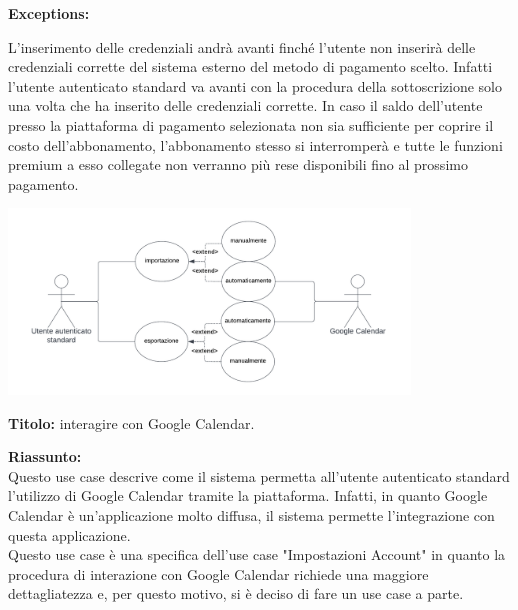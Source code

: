 \begin{listaPersonale}[UC]{}
\begin{listaPersonale2}[UC] {}
        \textbf{Exceptions:}
        \begin{enumerate}[label=\textbf{[exception \arabic{enumiii}]}, ref= \textbf{[exception \arabic{enumiii}]}]
             L'inserimento delle credenziali andrà avanti finché l'utente non inserirà delle credenziali corrette del sistema esterno del metodo di pagamento scelto. Infatti l'utente autenticato standard va avanti con la procedura della sottoscrizione solo una volta che ha inserito delle credenziali corrette.
             In caso il saldo dell'utente presso la piattaforma di pagamento selezionata non sia sufficiente per coprire il costo dell'abbonamento, l'abbonamento stesso si interromperà e tutte le funzioni premium a esso collegate non verranno più rese disponibili fino al prossimo pagamento.
        \end{enumerate}




        \begin{center}
            \includegraphics[width=0.8\textwidth]{img/Diagrammi/UseCases/GoogleCalendar.png}
        \end{center}


        \textbf{Titolo:} interagire con Google Calendar.

        \textbf{Riassunto:} \\
        Questo use case descrive come il sistema permetta all'utente autenticato standard l'utilizzo di Google Calendar tramite la piattaforma. Infatti, in quanto Google Calendar è un'applicazione molto diffusa, il sistema permette l'integrazione con questa applicazione. \\ 
        Questo use case è una specifica dell'use case "Impostazioni Account" in quanto la procedura di interazione con Google Calendar richiede una maggiore dettagliatezza e, per questo motivo, si è deciso di fare un use case a parte.
        


\end{listaPersonale2}
\end{listaPersonale}
